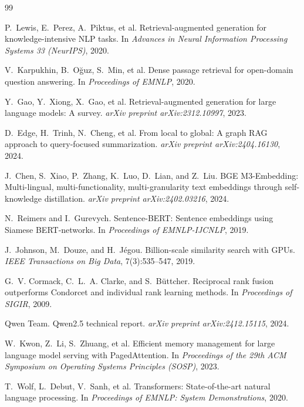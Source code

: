 \documentclass[11pt,a4paper]{article}
\begin{document}
\begin{thebibliography}{99}\setlength{\itemsep}{2pt}

P.~Lewis, E.~Perez, A.~Piktus, et al.
\newblock Retrieval-augmented generation for knowledge-intensive NLP tasks.
\newblock In \emph{Advances in Neural Information Processing Systems 33
(NeurIPS)}, 2020.

V.~Karpukhin, B.~O\u{g}uz, S.~Min, et al.
\newblock Dense passage retrieval for open-domain question answering.
\newblock In \emph{Proceedings of EMNLP}, 2020.

Y.~Gao, Y.~Xiong, X.~Gao, et al.
\newblock Retrieval-augmented generation for large language models: A survey.
\newblock \emph{arXiv preprint arXiv:2312.10997}, 2023.

D.~Edge, H.~Trinh, N.~Cheng, et al.
\newblock From local to global: A graph RAG approach to query-focused
summarization.
\newblock \emph{arXiv preprint arXiv:2404.16130}, 2024.

J.~Chen, S.~Xiao, P.~Zhang, K.~Luo, D.~Lian, and Z.~Liu.
\newblock BGE M3-Embedding: Multi-lingual, multi-functionality,
multi-granularity text embeddings through self-knowledge distillation.
\newblock \emph{arXiv preprint arXiv:2402.03216}, 2024.

N.~Reimers and I.~Gurevych.
\newblock Sentence-BERT: Sentence embeddings using Siamese BERT-networks.
\newblock In \emph{Proceedings of EMNLP-IJCNLP}, 2019.

J.~Johnson, M.~Douze, and H.~J\'egou.
\newblock Billion-scale similarity search with GPUs.
\newblock \emph{IEEE Transactions on Big Data}, 7(3):535--547, 2019.

G.~V. Cormack, C.~L.~A. Clarke, and S.~B\"uttcher.
\newblock Reciprocal rank fusion outperforms Condorcet and individual rank
learning methods.
\newblock In \emph{Proceedings of SIGIR}, 2009.

Qwen Team.
\newblock Qwen2.5 technical report.
\newblock \emph{arXiv preprint arXiv:2412.15115}, 2024.

W.~Kwon, Z.~Li, S.~Zhuang, et al.
\newblock Efficient memory management for large language model serving with
PagedAttention.
\newblock In \emph{Proceedings of the 29th ACM Symposium on Operating Systems
Principles (SOSP)}, 2023.

T.~Wolf, L.~Debut, V.~Sanh, et al.
\newblock Transformers: State-of-the-art natural language processing.
\newblock In \emph{Proceedings of EMNLP: System Demonstrations}, 2020.


\end{thebibliography}
\end{document}
